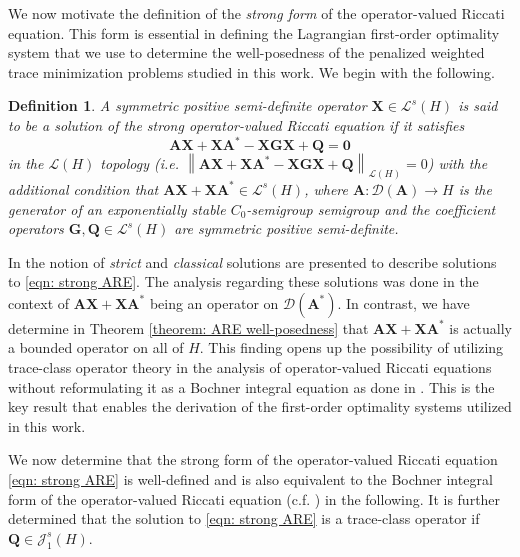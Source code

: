 \documentclass{amsart}
\newcommand{\sL}{\mathscr L}
\newcommand{\sJ}{\mathscr J}
\newcommand{\norm}[1]{\left\| #1 \right\|}
\newcommand{\bA}{\mathbf A}
\newcommand{\bX}{\mathbf X}
\newcommand{\bQ}{\mathbf Q}
\newcommand{\bG}{\mathbf G}
\newcommand{\ARE}{\bA \bX + \bX \bA^* - \bX \bG \bX + \bQ}
\newtheorem{definition}{Definition}
\begin{document}
We now motivate the definition of the \emph{strong form} of the operator-valued Riccati equation. This form is essential in defining the Lagrangian first-order optimality system that we use to determine the well-posedness of the penalized weighted trace minimization problems studied in this work. We begin with the following.

\begin{definition}
    A symmetric positive semi-definite operator $\bX \in \sL^s(H)$ is said to be a solution of the \emph{strong operator-valued Riccati equation} if it satisfies
    \begin{equation} \label{eqn: strong ARE}
        \ARE = \mathbf 0 
    \end{equation} 
    in the $\sL(H)$ topology (i.e. $\norm{\ARE}_{\sL(H)} = 0$) with the additional condition that $\bA\bX + \bX\bA^* \in \sL^s(H)$, where $\bA: \mathcal D(\bA) \rightarrow H$ is the generator of an exponentially stable $C_0$-semigroup semigroup and the coefficient operators $\bG,\bQ \in \sL^s(H)$ are symmetric positive semi-definite.
\end{definition}

In \cite[Chapter IV-1 Section 3]{bensoussan2007representation} the notion of \emph{strict} and \emph{classical} solutions are presented to describe solutions to \eqref{eqn: strong ARE}. The analysis regarding these solutions was done in the context of $\bA\bX+\bX\bA^*$ being an operator on $\mathcal D(\bA^*)$. In contrast, we have determine in Theorem \ref{theorem: ARE well-posedness} that $\bA\bX + \bX\bA^*$ is actually a bounded operator on all of $H$. This finding opens up the possibility of utilizing trace-class operator theory in the analysis of operator-valued Riccati equations without reformulating it as a Bochner integral equation as done in \cite{burns2015solutions}. This is the key result that enables the derivation of the first-order optimality systems utilized in this work. 

We now determine that the strong form of the operator-valued Riccati equation \eqref{eqn: strong ARE} is well-defined and is also equivalent to the Bochner integral form of the operator-valued Riccati equation (c.f. \cite{burns2015solutions}) in the following. It is further determined that the solution to \eqref{eqn: strong ARE} is a trace-class operator if $\bQ \in\sJ_1^s(H)$. 
\end{document}
